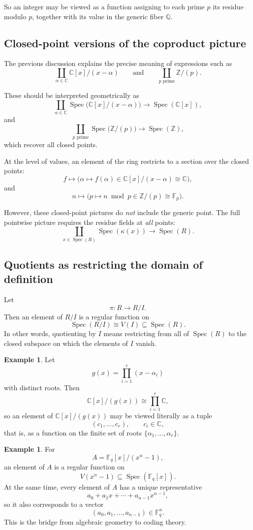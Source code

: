 \documentclass[11pt]{article}
\theoremstyle{definition}
\newtheorem{example}[theorem]{Example}
\newcommand{\Z}{\mathbb{Z}}
\newcommand{\Q}{\mathbb{Q}}
\newcommand{\C}{\mathbb{C}}
\newcommand{\F}{\mathbb{F}}
\newcommand{\Spec}{\operatorname{Spec}}
\newcommand{\kk}[1]{\kappa\!\left(#1\right)}
\begin{document}
So an integer may be viewed as a function assigning to each prime \(p\) its residue modulo \(p\), together with its value in the generic fiber \(\Q\).

\subsection{Closed-point versions of the coproduct picture}

The previous discussion explains the precise meaning of expressions such as
\[
\coprod_{\alpha\in \C}\C[x]/(x-\alpha)
\qquad\text{and}\qquad
\coprod_{p\text{ prime}}\Z/(p).
\]

These should be interpreted geometrically as
\[
\coprod_{\alpha\in \C}\Spec\!\bigl(\C[x]/(x-\alpha)\bigr)\to \Spec(\C[x]),
\]
and
\[
\coprod_{p\text{ prime}}\Spec\!\bigl(\Z/(p)\bigr)\to \Spec(\Z),
\]
which recover all closed points.

At the level of values, an element of the ring restricts to a section over the closed points:
\[
f \mapsto \bigl(\alpha\mapsto f(\alpha)\in \C[x]/(x-\alpha)\cong \C\bigr),
\]
and
\[
n \mapsto \bigl(p\mapsto n\bmod p \in \Z/(p)\cong \F_p\bigr).
\]

However, these closed-point pictures do \emph{not} include the generic point. The full pointwise picture requires the residue fields at \emph{all} points:
\[
\coprod_{x\in \Spec(R)} \Spec(\kk{x})\to \Spec(R).
\]

\subsection{Quotients as restricting the domain of definition}

Let
\[
\pi:R\to R/I.
\]
Then an element of \(R/I\) is a regular function on
\[
\Spec(R/I)\cong V(I)\subseteq \Spec(R).
\]
In other words, quotienting by \(I\) means restricting from all of \(\Spec(R)\) to the closed subspace on which the elements of \(I\) vanish.

\begin{example}
	Let
	\[
	g(x)=\prod_{i=1}^r (x-\alpha_i)
	\]
	with distinct roots. Then
	\[
	\C[x]/(g(x))\cong \prod_{i=1}^r \C,
	\]
	so an element of \(\C[x]/(g(x))\) may be viewed literally as a tuple
	\[
	(c_1,\dots,c_r),
	\qquad c_i\in \C,
	\]
	that is, as a function on the finite set of roots \(\{\alpha_1,\dots,\alpha_r\}\).
\end{example}

\begin{example}
	For
	\[
	A=\F_q[x]/(x^n-1),
	\]
	an element of \(A\) is a regular function on
	\[
	V(x^n-1)\subseteq \Spec(\F_q[x]).
	\]
	At the same time, every element of \(A\) has a unique representative
	\[
	a_0+a_1x+\cdots+a_{n-1}x^{n-1},
	\]
	so it also corresponds to a vector
	\[
	(a_0,a_1,\dots,a_{n-1})\in \F_q^n.
	\]
	This is the bridge from algebraic geometry to coding theory.
\end{example}
\end{document}
